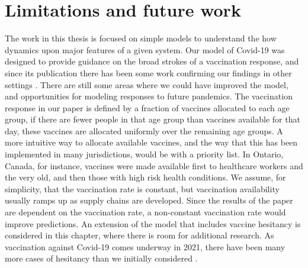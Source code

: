 \section{Limitations and future work}

The work in this thesis is focused on simple models to understand the how dynamics upon major features of a given system. Our model of Covid-19 was designed to provide guidance on the broad strokes of a vaccination response, and since its publication there has been some work confirming our findings in other settings \cite{chen2021age,hogan2021within}. There are still some areas where we could have improved the model, and opportunities for modeling responses to future pandemics. The vaccination response in our paper is defined by a fraction of vaccines allocated to each age group, if there are fewer people in that age group than vaccines available for that day, these vaccines are allocated uniformly over the remaining age groups. A more intuitive way to allocate available vaccines, and the way that this has been implemented in many jurisdictions, would be with a priority list. In Ontario, Canada, for instance, vaccines were made available first to healthcare workers and the very old, and then those with high risk health conditions.  We assume, for simplicity, that the vaccination rate is constant, but vaccination availability usually ramps up as supply chains are developed. Since the results of the paper are dependent on the vaccination rate, a non-constant vaccination rate would improve predictions. An extension of the model that includes vaccine hesitancy is considered in this chapter, where there is room for additional research. As vaccination against Covid-19 comes underway in 2021, there have been many more cases of hesitancy than we initially considered \cite{schwarzinger2021covid,soares2021factors,callaghan2020correlates}. 

